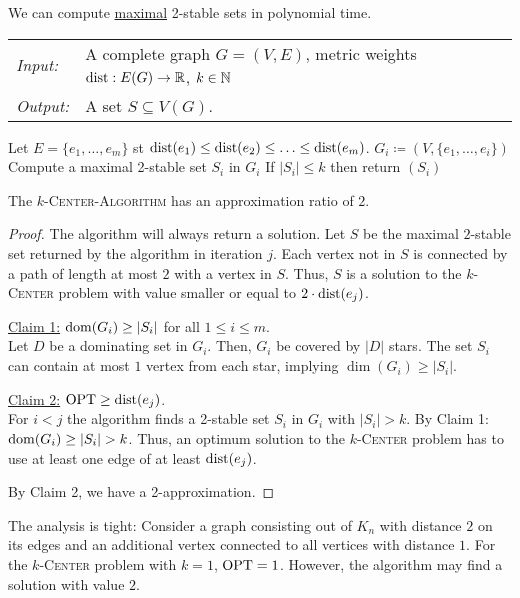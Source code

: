 \documentclass[../skript.tex]{subfiles}
\begin{document}
We can compute \underline{maximal} 2-stable sets in polynomial time.
\begin{algorithm}
\begin{tabular}{ll}
\textit{Input:} & A complete graph $G = (V, E)$, metric weights $\operatorname*{dist} : E(G) \to \mathbb{R}$, $k \in \mathbb{N}$ \\
\textit{Output:} & A set $S \subseteq V(G)$.
\end{tabular}
\begin{algorithmic}[1]
\State Let $E = \{ e_1, \ldots, e_m \}$ \ac{st} $\operatorname*{dist}(e_1) \leq \operatorname*{dist}(e_2) \leq \ldots \leq \operatorname*{dist}(e_m)$.
\State $G_i \coloneqq (V, \{ e_1, \ldots, e_i \})$
\State Compute a maximal 2-stable set $S_i$ in $G_i$
\State If $|S_i| \leq k$ then return $(S_i)$
\EndFor
\end{algorithmic}
\end{algorithm}
\begin{theorem} %
\label{thm:25}
The \textsc{$k$-Center-Algorithm} has an approximation ratio of $2$.
\end{theorem}
\begin{proof}
The algorithm will always return a solution.
Let $S$ be the maximal $2$-stable set returned by the algorithm in iteration $j$.
Each vertex not in $S$ is connected by a path of length at most $2$ with a vertex in $S$.
Thus, $S$ is a solution to the \textsc{$k$-Center} problem with value smaller or equal to $2 \cdot \operatorname*{dist}(e_j)$.

\underline{Claim 1:} $\operatorname{dom}(G_i) \geq |S_i|$ for all $1 \leq i \leq m$. \\
Let $D$ be a dominating set in $G_i$. Then, $G_i$ be covered by $|D|$ stars. The set $S_i$ can contain at most $1$ vertex from each star, implying $\dim(G_i) \geq |S_i|$.

\underline{Claim 2:} $\operatorname{OPT} \geq \operatorname*{dist}(e_j)$. \\
For $i < j$ the algorithm finds a 2-stable set $S_i$ in $G_i$ with $|S_i| > k$. By Claim 1: $\operatorname{dom}(G_i) \geq |S_i| > k$.
Thus, an optimum solution to the \textsc{$k$-Center} problem has to use at least one edge of at least $\operatorname*{dist}(e_j)$.

By Claim 2, we have a 2-approximation.
\end{proof} 
\begin{remark}
The analysis is tight:
Consider a graph consisting out of $K_n$ with distance $2$ on its edges and an additional vertex connected to all vertices with distance $1$. For the \textsc{$k$-Center} problem with $k = 1$, $\operatorname{OPT} = 1$. However, the algorithm may find a solution with value $2$.
\end{remark}
\end{document}
